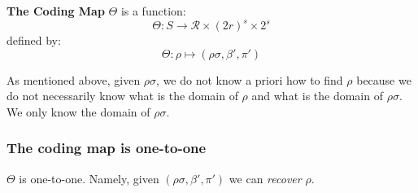\noindent
\textbf{The Coding Map} \( \Theta \) is a function:
\[
\Theta: S \to \mathcal{R} \times (2r)^s \times 2^s
\]
defined by:
\[
\Theta: \rho \mapsto (\rho\sigma, \beta', \pi')
\]

\begin{note}
As mentioned above, given \( \rho\sigma \), we do not know a priori how to find \( \rho \) because we do not necessarily  know what is the domain of \( \rho \) and what is the domain of \( \rho\sigma \). We only know the domain of \( \rho\sigma \).
\end{note}



% 
% 

 
\subsubsection{The coding map is one-to-one}   

\begin{lemma}\label{lem:SL-coding-map-1-1}
\(\Theta\) is one-to-one. Namely, given \( (\rho\sigma, \beta', \pi') \) we can \emph{recover}  \( \rho \).
\end{lemma}

